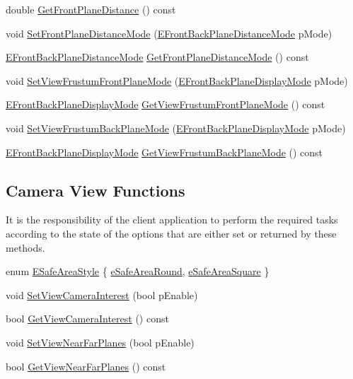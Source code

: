 \begin{DoxyCompactItemize}
\item 
double \hyperlink{class_fbx_camera_a3097c7c0e8a3ce8e809c248d9d8be18b}{Get\+Front\+Plane\+Distance} () const
\item 
void \hyperlink{class_fbx_camera_ab0ea0c88ba780d06d5b6ac9c6f128c23}{Set\+Front\+Plane\+Distance\+Mode} (\hyperlink{class_fbx_camera_a79e74898d117e741c3fbd10b1ef21c79}{E\+Front\+Back\+Plane\+Distance\+Mode} p\+Mode)
\item 
\hyperlink{class_fbx_camera_a79e74898d117e741c3fbd10b1ef21c79}{E\+Front\+Back\+Plane\+Distance\+Mode} \hyperlink{class_fbx_camera_a2923892fe43a8d86e9a2902d94672dfe}{Get\+Front\+Plane\+Distance\+Mode} () const
\item 
void \hyperlink{class_fbx_camera_a004e8efe0afd8f7e688d7cd6c488b9e2}{Set\+View\+Frustum\+Front\+Plane\+Mode} (\hyperlink{class_fbx_camera_ab7b9d3e546552049a79261a444f9b44a}{E\+Front\+Back\+Plane\+Display\+Mode} p\+Mode)
\item 
\hyperlink{class_fbx_camera_ab7b9d3e546552049a79261a444f9b44a}{E\+Front\+Back\+Plane\+Display\+Mode} \hyperlink{class_fbx_camera_a83d93dc9f981ac175f8dfecfa0cf15eb}{Get\+View\+Frustum\+Front\+Plane\+Mode} () const
\item 
void \hyperlink{class_fbx_camera_ab7a31318dfa38c8dc9baec9dd04b4dab}{Set\+View\+Frustum\+Back\+Plane\+Mode} (\hyperlink{class_fbx_camera_ab7b9d3e546552049a79261a444f9b44a}{E\+Front\+Back\+Plane\+Display\+Mode} p\+Mode)
\item 
\hyperlink{class_fbx_camera_ab7b9d3e546552049a79261a444f9b44a}{E\+Front\+Back\+Plane\+Display\+Mode} \hyperlink{class_fbx_camera_a8ff114b2298675c573b31428ede34871}{Get\+View\+Frustum\+Back\+Plane\+Mode} () const
\end{DoxyCompactItemize}
\subsection*{Camera View Functions}
\label{_amgrpd839afaa899dcf65c23a9ee3a6dbf6a5}%
It is the responsibility of the client application to perform the required tasks according to the state of the options that are either set or returned by these methods. \begin{DoxyCompactItemize}
\item 
enum \hyperlink{class_fbx_camera_aa9fb36da95d392ac56ff2d8b44171210}{E\+Safe\+Area\+Style} \{ \hyperlink{class_fbx_camera_aa9fb36da95d392ac56ff2d8b44171210a6dd0a7f20c45e47d90d1dce69b1ef373}{e\+Safe\+Area\+Round}, 
\hyperlink{class_fbx_camera_aa9fb36da95d392ac56ff2d8b44171210ae2e0036884ecd1c9547689829431794b}{e\+Safe\+Area\+Square}
 \}
\item 
void \hyperlink{class_fbx_camera_a1d7051d940ae08dd4ef8e8283dee3e9a}{Set\+View\+Camera\+Interest} (bool p\+Enable)
\item 
bool \hyperlink{class_fbx_camera_a37fccd3efdcbde412e147c42bd08af0a}{Get\+View\+Camera\+Interest} () const
\item 
void \hyperlink{class_fbx_camera_a1e12b34c16548903eef5e2863127510f}{Set\+View\+Near\+Far\+Planes} (bool p\+Enable)
\item 
bool \hyperlink{class_fbx_camera_a17d96c024f27e60b04ce3748383db422}{Get\+View\+Near\+Far\+Planes} () const
\end{DoxyCompactItemize}
